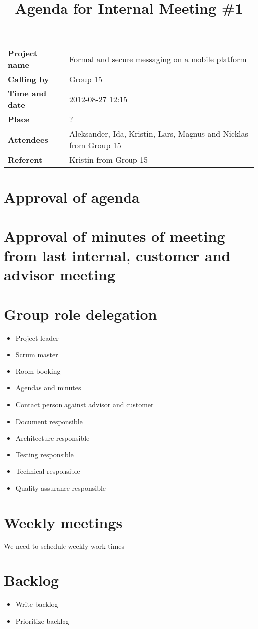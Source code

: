 \documentclass[a4paper,12pt]{article}
\begin{document}
\title{Agenda for Internal Meeting \#1}
\maketitle
\begin{tabular}{>{\bfseries}l l}	
Project name&Formal and secure messaging on a mobile platform\\
Calling by&Group 15\\
Time and date&2012-08-27 12:15\\
Place&?\\
Attendees&Aleksander, Ida, Kristin, Lars, Magnus and Nicklas from Group 15\\
Referent&Kristin from Group 15\\
\end{tabular}

\section{Approval of agenda}
\section{Approval of minutes of meeting from last internal, customer and advisor meeting}
\section{Group role delegation}
\begin{itemize}
\item
Project leader
\item
Scrum master
\item
Room booking
\item
Agendas and minutes
\item
Contact person against advisor and customer
\item
Document responsible
\item
Architecture responsible
\item
Testing responsible
\item
Technical responsible
\item
Quality assurance responsible
\end{itemize}
\section{Weekly meetings}
We need to schedule weekly work times
\section{Backlog}
\begin{itemize}
\item
Write backlog
\item
Prioritize backlog
\end{itemize}
\end{document}
